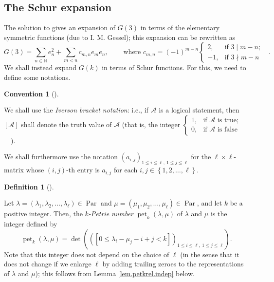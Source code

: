 \documentclass[numbers=enddot,12pt,final,onecolumn,notitlepage]{scrartcl}%
\theoremstyle{definition}
\newtheorem{defi}[theo]{Definition}
\newenvironment{definition}[1][]
{\begin{defi}[#1]\begin{leftbar}}
{\end{leftbar}\end{defi}}
\newtheorem{conv}[theo]{Convention}
\newenvironment{convention}[1][]
{\begin{conv}[#1]\begin{leftbar}}
{\end{leftbar}\end{conv}}
\let\sumnonlimits\sum
\renewcommand{\sum}{\sumnonlimits\limits}
\begin{document}
\subsection{\label{subsect.petk.schur}The Schur expansion}

The solution to \cite[Exercise 7.3]{Stanley-EC2} gives an expansion of
$G\left(  3\right)  $ in terms of the elementary symmetric functions (due to
I. M. Gessel); this expansion can be rewritten as%
\[
G\left(  3\right)  =\sum_{n\in\mathbb{N}}e_{n}^{2}+\sum_{m<n}c_{m,n}e_{m}%
e_{n},\ \ \ \ \ \ \ \ \ \ \text{where }c_{m,n}=\left(  -1\right)  ^{m-n}%
\begin{cases}
2, & \text{if }3\mid m-n;\\
-1, & \text{if }3\nmid m-n
\end{cases}
\ \ \ .
\]
We shall instead expand $G\left(  k\right)  $ in terms of Schur functions. For
this, we need to define some notations.

\begin{convention}
\label{conv.iverson}We shall use the \emph{Iverson bracket notation}: i.e., if
$\mathcal{A}$ is a logical statement, then $\left[  \mathcal{A}\right]  $
shall denote the truth value of $\mathcal{A}$ (that is, the integer $%
\begin{cases}
1, & \text{if }\mathcal{A}\text{ is true;}\\
0, & \text{if }\mathcal{A}\text{ is false}%
\end{cases}
$\ \ ).
\end{convention}

We shall furthermore use the notation $\left(  a_{i,j}\right)  _{1\leq
i\leq\ell,\ 1\leq j\leq\ell}$ for the $\ell\times\ell$-matrix whose $\left(
i,j\right)  $-th entry is $a_{i,j}$ for each $i,j\in\left\{  1,2,\ldots
,\ell\right\}  $.

\begin{definition}
\label{def.petklam} Let $\lambda=\left(  \lambda_{1},\lambda_{2}%
,\ldots,\lambda_{\ell}\right)  \in\operatorname*{Par}$ and $\mu=\left(
\mu_{1},\mu_{2},\ldots,\mu_{\ell}\right)  \in\operatorname*{Par}$, and let $k$
be a positive integer. Then, the $k$\emph{-Petrie number} $\operatorname*{pet}%
\nolimits_{k}\left(  \lambda,\mu\right)  $ of $\lambda$ and $\mu$ is the
integer defined by%
\[
\operatorname*{pet}\nolimits_{k}\left(  \lambda,\mu\right)  =\det\left(
\left(  \left[  0\leq\lambda_{i}-\mu_{j}-i+j<k\right]  \right)  _{1\leq
i\leq\ell,\ 1\leq j\leq\ell}\right)  .
\]
Note that this integer does not depend on the choice of $\ell$ (in the sense
that it does not change if we enlarge $\ell$ by adding trailing zeroes to the
representations of $\lambda$ and $\mu$); this follows from Lemma
\ref{lem.petkrel.indep} below.
\end{definition}
\end{document}
